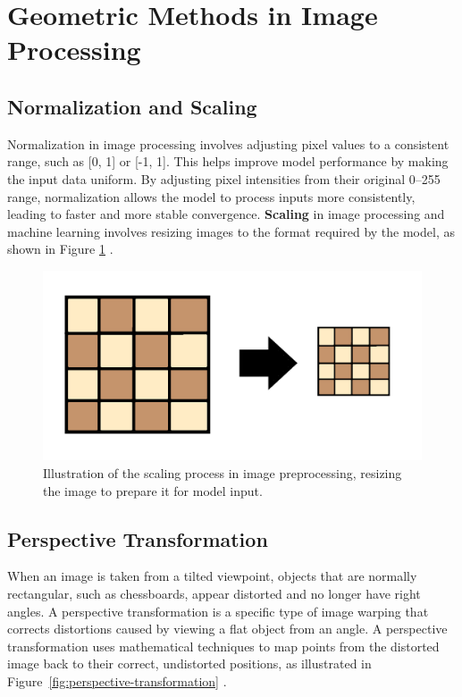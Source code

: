 \newpage

\section{Geometric Methods in Image Processing}
\label{sec:geometric-methods}

\subsection{Normalization and Scaling}
\label{subsec:normalization-and-scaling}

Normalization in image processing involves adjusting pixel values to a consistent range, such as [0, 1] or [-1, 1]. This helps improve model performance by making the input data uniform. By adjusting pixel intensities from their original 0–255 range, normalization allows the model to process inputs more consistently, leading to faster and more stable convergence.
\textbf{Scaling} in image processing and machine learning involves resizing images to the format required by the model, as shown in Figure \ref{fig:scaling} \cite{brownlee:normalization}. 

\begin{figure}[h!]
    \centering
    \includegraphics[width=0.75\linewidth]{figures/theory/image-recognition/scaling.png}
    \caption[Scaling before and after]{Illustration of the scaling process in image preprocessing, resizing the image to prepare it for model input.}
    \label{fig:scaling}
\end{figure}

\subsection{Perspective Transformation}
\label{subsec:perspective-transformation}

When an image is taken from a tilted viewpoint, objects that are normally rectangular, such as chessboards, appear distorted and no longer have right angles. A perspective transformation is a specific type of image warping that corrects distortions caused by viewing a flat object from an angle. A perspective transformation uses mathematical techniques to map points from the distorted image back to their correct, undistorted positions, as illustrated in Figure~\ref{fig:perspective-transformation} \cite{nvidia:perspective-transform}.

